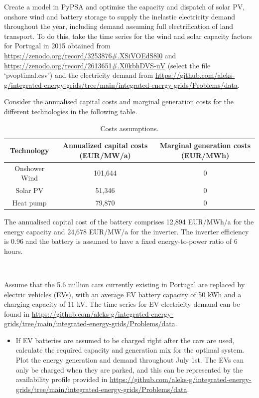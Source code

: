 \documentclass[10pt]{article}
\newenvironment{problem}[2][Problem]{\begin{trivlist}
\item[\hskip \labelsep {\bfseries #1}\hskip \labelsep {\bfseries #2.}]}{\end{trivlist}}
\begin{document}
\begin{problem}{11.2}

Create a model in PyPSA and optimise the capacity and dispatch of solar PV, onshore wind and battery storage to supply the inelastic electricity demand throughout the year, including demand assuming full electrification of land transport. To do this, take the time series for the wind and solar capacity factors for Portugal in 2015 obtained from \url{https://zenodo.org/record/3253876#.XSiVOEdS8l0}
and \url{https://zenodo.org/record/2613651#.X0kbhDVS-uV} (select the file ‘pvoptimal.csv’) and the electricity demand from \url{https://github.com/aleks-g/integrated-energy-grids/tree/main/integrated-energy-grids/Problems/data}.

Consider the annualised capital costs and marginal generation costs for the different technologies in the following table. 

\begin{table}[h]
    \centering
    \begin{tabular}{ccc}
    \hline
        Technology & Annualized capital costs (EUR/MW/a) & Marginal generation costs (EUR/MWh) \\
    \hline
    Onshower Wind &  101,644 & 0 \\
         Solar PV &  51,346 & 0 \\
         Heat pump & 79,870 &  0  \\
    \hline
    \end{tabular}
    \caption{Costs assumptions.}
    \label{tab:my_label}
\end{table}

The annualised capital cost of the battery comprises 12,894 EUR/MWh/a for the energy capacity and 24,678 EUR/MW/a for the inverter. The inverter efficiency is 0.96 and the battery is assumed to have a fixed energy-to-power ratio of 6 hours.

\

 Assume that the 5.6 million cars currently existing in Portugal are replaced by electric vehicles (EVs), with an average EV battery capacity of 50 kWh and a charging capacity of 11 kV. The time series for EV electricity demand can be found in \url{https://github.com/aleks-g/integrated-energy-grids/tree/main/integrated-energy-grids/Problems/data}.

 

\begin{itemize}
\item[a)] If EV batteries are assumed to be charged right after the cars are used, calculate the required capacity and generation mix for the optimal system. Plot the energy generation and demand throughout July 1st. The EVs can only be charged when they are parked, and this can be represented by the availability profile provided in \url{https://github.com/aleks-g/integrated-energy-grids/tree/main/integrated-energy-grids/Problems/data}.


\end{itemize}
\end{problem}
\end{document}
